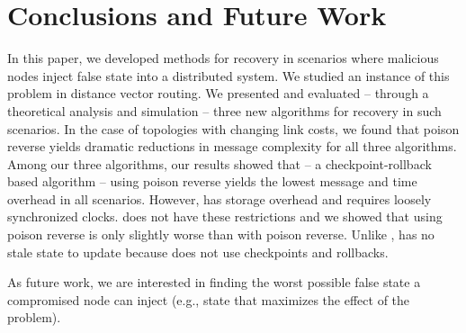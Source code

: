 \section{Conclusions and Future Work}
\label{sec:future}

In this paper, we developed methods for recovery in scenarios where malicious nodes inject false state into a distributed system.  
We studied an instance of this problem in distance vector routing. 
We presented and evaluated -- through a theoretical analysis and simulation -- three new algorithms for recovery in such scenarios. %
In the case of topologies with changing link costs, we found that poison reverse yields dramatic reductions in message complexity for all three algorithms. 
Among our three algorithms, our results showed that \cpr -- a checkpoint-rollback based algorithm -- using poison reverse yields the lowest message and time overhead in all scenarios. 
However, \cpr has storage overhead and requires loosely synchronized clocks. %
\purge does not have these restrictions and we showed that \purge using poison reverse is only slightly worse than \cpr with poison reverse.
Unlike \cprs, \purge has no stale state to update because \purge does not use checkpoints and rollbacks. 

As future work, we are interested in finding the worst possible false state a compromised node can inject (e.g., state that maximizes the effect of the \infinity problem).



